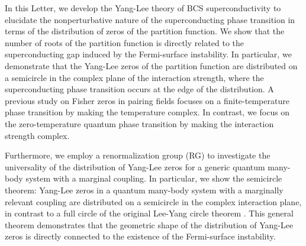 \documentclass[aps,prl,twocolumn,superscriptaddress]{revtex4-1}
\begin{document}
In this Letter, we develop the Yang-Lee theory of BCS superconductivity to elucidate the nonperturbative nature of the superconducting phase transition in terms of the distribution of zeros of the partition function. We show that the number of roots of the partition function is directly related to the superconducting gap induced by the Fermi-surface instability. In particular, we demonstrate that the Yang-Lee zeros of the partition function are distributed on a semicircle in the complex plane of the interaction strength, where the superconducting phase transition occurs at the edge of the distribution.
A previous study \cite{Sumaryada:2007uu} on Fisher zeros in pairing fields focuses on a finite-temperature phase transition by making the temperature complex. In contrast, we focus on the zero-temperature quantum phase transition by making the interaction strength complex.  %
\begin{comment}
In this Letter, we develop a theory of Yang-Lee zeros in BCS superconductivity and show that Yang-Lee zeros are distributed on a semicircle on the complex plane of interaction strength due to the Fermi-surface pairing instability.
We demonstrate that the superconducting phase transition occurs at
the edge of the distribution of Yang-Lee zeros and the nonperturbative
behavior of the phase transition is encoded in the number of roots of the partition function in the energy space. In contrast to a previous study \cite{Sumaryada:2007uu} on Fisher zeros in pairing fields at complex temperature in a finite-temperature phase transition, we extend the interaction strength to a complex regime at absolute zero with a focus on the quantum phase transition.
\end{comment}


Furthermore, we employ a renormalization group (RG) to investigate the 
universality of the distribution of Yang-Lee zeros
for a generic quantum many-body system with a marginal coupling. In particular, we show the semicircle theorem: Yang-Lee zeros in a quantum many-body system with a marginally relevant coupling are distributed on a semicircle
in the complex interaction plane, in contrast to a full circle of the original Lee-Yang circle
theorem \cite{PhysRev.87.404,PhysRev.87.410}. This general theorem demonstrates that the geometric shape of the distribution of Yang-Lee zeros is directly connected to the existence of the Fermi-surface instability.%
\end{document}

